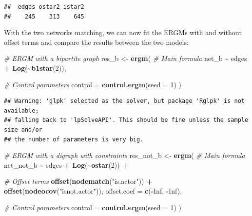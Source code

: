 \documentclass[
]{book}
\newenvironment{Shaded}{\begin{snugshade}}{\end{snugshade}}
\newcommand{\AttributeTok}[1]{\textcolor[rgb]{0.13,0.29,0.53}{#1}}
\newcommand{\CommentTok}[1]{\textcolor[rgb]{0.56,0.35,0.01}{\textit{#1}}}
\newcommand{\ConstantTok}[1]{\textcolor[rgb]{0.56,0.35,0.01}{#1}}
\newcommand{\DecValTok}[1]{\textcolor[rgb]{0.00,0.00,0.81}{#1}}
\newcommand{\FunctionTok}[1]{\textcolor[rgb]{0.13,0.29,0.53}{\textbf{#1}}}
\newcommand{\NormalTok}[1]{#1}
\newcommand{\OtherTok}[1]{\textcolor[rgb]{0.56,0.35,0.01}{#1}}
\newcommand{\SpecialCharTok}[1]{\textcolor[rgb]{0.81,0.36,0.00}{\textbf{#1}}}
\newcommand{\StringTok}[1]{\textcolor[rgb]{0.31,0.60,0.02}{#1}}
\begin{document}
\begin{verbatim}
##  edges ostar2 istar2 
##    245    313    645
\end{verbatim}

With the two networks matching, we can now fit the ERGMs with and without
offset terms and compare the results between the two models:

\begin{Shaded}
\begin{Highlighting}[]
\CommentTok{\# ERGM with a bipartite graph}
\NormalTok{res\_b     }\OtherTok{\textless{}{-}} \FunctionTok{ergm}\NormalTok{(}
  \CommentTok{\# Main formula}
\NormalTok{  net\_b }\SpecialCharTok{\textasciitilde{}}\NormalTok{ edges }\SpecialCharTok{+} \FunctionTok{Log}\NormalTok{(}\SpecialCharTok{\textasciitilde{}}\FunctionTok{b1star}\NormalTok{(}\DecValTok{2}\NormalTok{)),}

  \CommentTok{\# Control parameters}
  \AttributeTok{control =} \FunctionTok{control.ergm}\NormalTok{(}\AttributeTok{seed =} \DecValTok{1}\NormalTok{)}
\NormalTok{  )}
\end{Highlighting}
\end{Shaded}

\begin{verbatim}
## Warning: 'glpk' selected as the solver, but package 'Rglpk' is not available;
## falling back to 'lpSolveAPI'. This should be fine unless the sample size and/or
## the number of parameters is very big.
\end{verbatim}

\begin{Shaded}
\begin{Highlighting}[]
\CommentTok{\# ERGM with a digraph with constraints}
\NormalTok{res\_not\_b }\OtherTok{\textless{}{-}} \FunctionTok{ergm}\NormalTok{(}
  \CommentTok{\# Main formula}
\NormalTok{  net\_not\_b }\SpecialCharTok{\textasciitilde{}}\NormalTok{ edges }\SpecialCharTok{+} \FunctionTok{Log}\NormalTok{(}\SpecialCharTok{\textasciitilde{}}\FunctionTok{ostar}\NormalTok{(}\DecValTok{2}\NormalTok{)) }\SpecialCharTok{+}

  \CommentTok{\# Offset terms }
  \FunctionTok{offset}\NormalTok{(}\FunctionTok{nodematch}\NormalTok{(}\StringTok{"is.actor"}\NormalTok{)) }\SpecialCharTok{+} \FunctionTok{offset}\NormalTok{(}\FunctionTok{nodeocov}\NormalTok{(}\StringTok{"isnot.actor"}\NormalTok{)),}
  \AttributeTok{offset.coef =} \FunctionTok{c}\NormalTok{(}\SpecialCharTok{{-}}\ConstantTok{Inf}\NormalTok{, }\SpecialCharTok{{-}}\ConstantTok{Inf}\NormalTok{),}

  \CommentTok{\# Control parameters}
  \AttributeTok{control =} \FunctionTok{control.ergm}\NormalTok{(}\AttributeTok{seed =} \DecValTok{1}\NormalTok{)}
\NormalTok{  )}
\end{Highlighting}
\end{Shaded}
\end{document}
